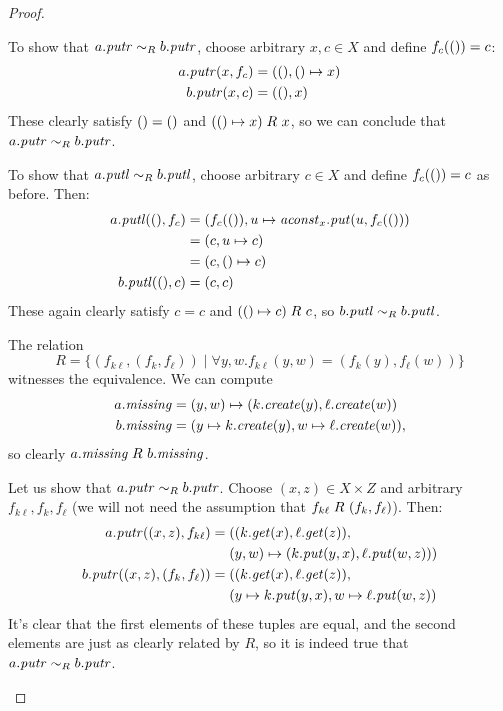 \begin{defn}[$R$-similarity]
\begin{theorem}
\begin{lemma}
\begin{theorem}[No products]
\begin{lemma}
\begin{defn}
\begin{theorem}
\begin{corollary}[Hylomorphism]
\begin{defn}
\begin{defn}[Symmetrization]
\begin{proof}
\begin{longenum}
To show that $a.\mathit{putr} \sim_R b.\mathit{putr}$, choose arbitrary $x,c \in X$ and
define $f_c({()})=c$:
\begin{align*}
    a.\mathit{putr}(x,f_c) &= ({()},{()} \mapsto x) \\
    b.\mathit{putr}(x,c) &= ({()},x)
\end{align*}
These clearly satisfy ${()} = {()}$ and $({()} \mapsto x) \mathrel{R_{}} x$, so we
can conclude that $a.\mathit{putr} \sim_R b.\mathit{putr}$.

To show that $a.\mathit{putl} \sim_R b.\mathit{putl}$, choose arbitrary $c \in X$ and define
$f_c({()})=c$ as before. Then:
\begin{align*}
    a.\mathit{putl}({()},f_c) &= (f_c({()}),u \mapsto \mathit{aconst}_x.\mathit{put}(u,f_c({()})) \\
    &= (c,u \mapsto c) \\
    &= (c,{()} \mapsto c) \\
    b.\mathit{putl}({()},c) &= (c,c)
\end{align*}
These again clearly satisfy $c = c$ and $({()} \mapsto c) \mathrel{R_{}} c$, so
$b.\mathit{putl} \sim_R b.\mathit{putl}$.

\item The relation
\[R = \{(f_{k\ell},(f_k,f_\ell)) \mid \forall y,w. f_{k\ell}(y,w)=(f_k(y),f_\ell(w)) \}\]
witnesses the equivalence. We can compute
\begin{align*}
    a.\mathit{missing} &= (y,w) \mapsto (k.\mathit{create}(y),\ell.\mathit{create}(w)) \\
    b.\mathit{missing} &= (y \mapsto k.\mathit{create}(y),w \mapsto \ell.\mathit{create}(w)),
\end{align*}
so clearly $a.\mathit{missing} \mathrel{R_{}} b.\mathit{missing}$.

Let us show that $a.\mathit{putr} \sim_R b.\mathit{putr}$. Choose $(x,z) \in X \times Z$ and
arbitrary $f_{k\ell},f_k,f_\ell$ (we will not need the assumption that
$f_{k\ell} \mathrel{R_{}} (f_k,f_\ell)$). Then:
\begin{align*}
    a.\mathit{putr}((x,z),f_{k\ell}) ={}
    & ((k.\mathit{get}(x),\ell.\mathit{get}(z)), \\
    & (y,w) \mapsto (k.\mathit{put}(y,x),\ell.\mathit{put}(w,z))) \\
    b.\mathit{putr}((x,z),(f_k,f_\ell)) ={}
    & ((k.\mathit{get}(x),\ell.\mathit{get}(z)), \\
    & (y \mapsto k.\mathit{put}(y,x),w \mapsto \ell.\mathit{put}(w,z))
\end{align*}
It's clear that the first elements of these tuples are equal, and the second
elements are just as clearly related by $R$, so it is indeed true that
$a.\mathit{putr} \sim_R b.\mathit{putr}$.


\end{longenum}
\end{proof}
\end{defn}
\end{defn}
\end{corollary}
\end{theorem}
\end{defn}
\end{lemma}
\end{theorem}
\end{lemma}
\end{theorem}
\end{defn}
